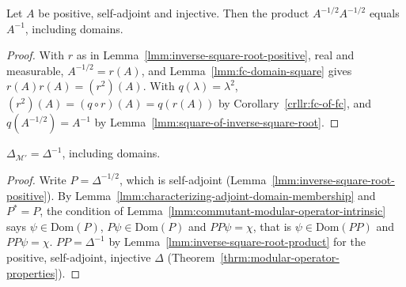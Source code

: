 \begin{lemma}[$A^{-1/2}A^{-1/2} = A^{-1}$]
    \label{lmm:inverse-square-root-product}
    \leanok
    Let $A$ be positive, self-adjoint and injective. Then the product $A^{-1/2}A^{-1/2}$ equals $A^{-1}$, including domains.
\end{lemma}
\begin{proof}
    \leanok
    With $r$ as in Lemma~\ref{lmm:inverse-square-root-positive}, real and measurable, $A^{-1/2} = r(A)$, and Lemma~\ref{lmm:fc-domain-square} gives $r(A)r(A) = (r^2)(A)$. With $q(\lambda) = \lambda^2$, $(r^2)(A) = (q \circ r)(A) = q(r(A))$ by Corollary~\ref{crllr:fc-of-fc}, and $q(A^{-1/2}) = A^{-1}$ by Lemma~\ref{lmm:square-of-inverse-square-root}.
\end{proof}

\begin{lemma}[$\Delta_{\mathcal{M}'} = \Delta^{-1}$]
    \label{lmm:commutant-modular-operator}
    \leanok
    $\Delta_{\mathcal{M}'} = \Delta^{-1}$, including domains.
\end{lemma}
\begin{proof}
    \leanok
    Write $P = \Delta^{-1/2}$, which is self-adjoint (Lemma~\ref{lmm:inverse-square-root-positive}). By Lemma~\ref{lmm:characterizing-adjoint-domain-membership} and $P^* = P$, the condition of Lemma~\ref{lmm:commutant-modular-operator-intrinsic} says $\psi \in \text{Dom}(P)$, $P\psi \in \text{Dom}(P)$ and $PP\psi = \chi$, that is $\psi \in \text{Dom}(PP)$ and $PP\psi = \chi$. $PP = \Delta^{-1}$ by Lemma~\ref{lmm:inverse-square-root-product} for the positive, self-adjoint, injective $\Delta$ (Theorem~\ref{thrm:modular-operator-properties}).
\end{proof}

